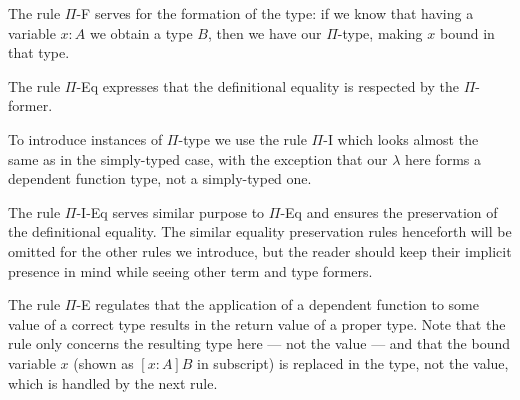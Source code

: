 \begin{definition}
\end{definition}

The rule $\Pi$-F serves for the formation of the type: if we know that having a
variable $x: A$ we obtain a type $B$, then we have our $\Pi$-type, making $x$
bound in that type.

The rule $\Pi$-Eq expresses that the definitional equality is respected by the
$\Pi$-former.

To introduce instances of $\Pi$-type we use the rule $\Pi$-I which looks almost
the same as in the simply-typed case, with the exception that our $\lambda$
here forms a dependent function type, not a simply-typed one.

The rule $\Pi$-I-Eq serves similar purpose to $\Pi$-Eq and ensures the
preservation of the definitional equality. The similar equality preservation
rules henceforth will be omitted for the other rules we introduce, but the
reader should keep their implicit presence in mind while seeing other term and
type formers.

The rule $\Pi$-E regulates that the application of a dependent function to some
value of a correct type results in the return value of a proper type. Note that
the rule only concerns the resulting type here --- not the value --- and that
the bound variable $x$ (shown as $[x : A] B$ in subscript) is replaced in the
type, not the value, which is handled by the next rule.

